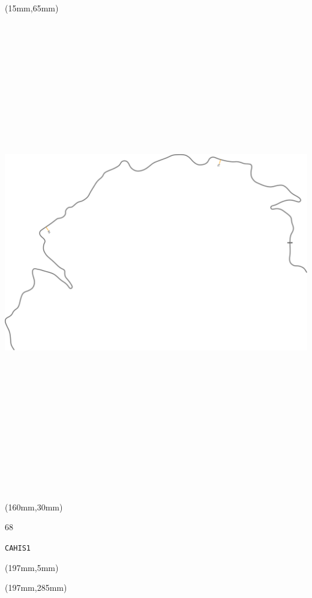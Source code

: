 \begin{textblock*}{185mm}(15mm,65mm)%
\centering
\mbox{\includegraphics[width=185mm,height=210mm,keepaspectratio]{PT/CAHIS1.pdf}}
\end{textblock*}
\begin{textblock*}{40mm}(160mm,30mm)%
\Large
\par{} 
\par68 
\par\hfill\tiny\tt CAHIS1\\
\end{textblock*}
\begin{textblock*}{20mm}(197mm,5mm)%
\fbox{\thepage}
\label{CAHIS1}
\end{textblock*}
\begin{textblock*}{20mm}(197mm,285mm)%
\fbox{\thepage}
\end{textblock*}

